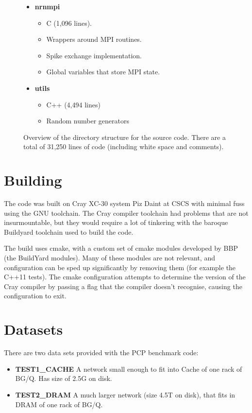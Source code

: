 \documentclass[11pt,a4paper]{article}
\begin{document}
\begin{figure}[tp!]
{{\begin{itemize}
    \item \textbf{nrnmpi}
    \begin{itemize}
        \item C (1,096 lines).
        \item Wrappers around MPI routines.
        \item Spike exchange implementation.
        \item Global variables that store MPI state.
    \end{itemize}

    \item \textbf{utils}
    \begin{itemize}
        \item C++ (4,494 lines)
        \item Random number generators
    \end{itemize}
\end{itemize}

}}

\caption{Overview of the directory structure for the source code. There are a total of 31,250 lines of code (including white space and comments).}
\label{fig:DirectoryStructure}

\end{figure}

\section{Building}
The code was built on Cray XC-30 system Piz Daint at CSCS with minimal fuss using the GNU toolchain.
The Cray compiler toolchain had problems that are not insurmountable, but they would require a lot of tinkering with the baroque Buildyard toolchain used to build the code.

The build uses cmake, with a custom set of cmake modules developed by BBP (the BuildYard modules). Many of these modules are not relevant, and configuration can be sped up significantly by removing them (for example the C++11 tests). The cmake configuration attempts to determine the version of the Cray compiler by passing a flag that the compiler doesn't recognise, causing the configuration to exit.

\section{Datasets}
There are two data sets provided with the PCP benchmark code:
\begin{itemize}
    \item \textbf{TEST1\_CACHE} A network small enough to fit into Cache of one rack of BG/Q. Has size of 2.5G on disk.
    \item \textbf{TEST2\_DRAM} A much larger network (size 4.5T on disk), that fits in DRAM of one rack of BG/Q.
\end{itemize}
\end{document}
